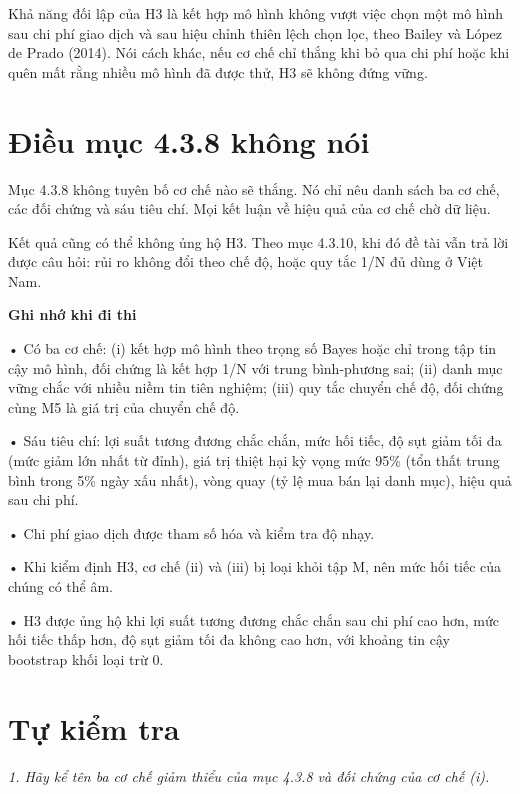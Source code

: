Khả năng đối lập của H3 là kết hợp mô hình không vượt việc chọn một mô hình sau chi phí giao dịch và sau hiệu chỉnh thiên lệch chọn lọc, theo Bailey và López de Prado (2014). Nói cách khác, nếu cơ chế chỉ thắng khi bỏ qua chi phí hoặc khi quên mất rằng nhiều mô hình đã được thử, H3 sẽ không đứng vững.

\section{Điều mục 4.3.8 không nói}

Mục 4.3.8 không tuyên bố cơ chế nào sẽ thắng. Nó chỉ nêu danh sách ba cơ chế, các đối chứng và sáu tiêu chí. Mọi kết luận về hiệu quả của cơ chế chờ dữ liệu.

Kết quả cũng có thể không ủng hộ H3. Theo mục 4.3.10, khi đó đề tài vẫn trả lời được câu hỏi: rủi ro không đổi theo chế độ, hoặc quy tắc 1/N đủ dùng ở Việt Nam.

\begin{tcolorbox}[breakable]
\textbf{Ghi nhớ khi đi thi}

• Có ba cơ chế: (i) kết hợp mô hình theo trọng số Bayes hoặc chỉ trong tập tin cậy mô hình, đối chứng là kết hợp 1/N với trung bình-phương sai; (ii) danh mục vững chắc với nhiều niềm tin tiên nghiệm; (iii) quy tắc chuyển chế độ, đối chứng cùng M5 là giá trị của chuyển chế độ.

• Sáu tiêu chí: lợi suất tương đương chắc chắn, mức hối tiếc, độ sụt giảm tối đa (mức giảm lớn nhất từ đỉnh), giá trị thiệt hại kỳ vọng mức 95\% (tổn thất trung bình trong 5\% ngày xấu nhất), vòng quay (tỷ lệ mua bán lại danh mục), hiệu quả sau chi phí.

• Chi phí giao dịch được tham số hóa và kiểm tra độ nhạy.

• Khi kiểm định H3, cơ chế (ii) và (iii) bị loại khỏi tập M, nên mức hối tiếc của chúng có thể âm.

• H3 được ủng hộ khi lợi suất tương đương chắc chắn sau chi phí cao hơn, mức hối tiếc thấp hơn, độ sụt giảm tối đa không cao hơn, với khoảng tin cậy bootstrap khối loại trừ 0.
\end{tcolorbox}

\section{Tự kiểm tra}

{\itshape 1. Hãy kể tên ba cơ chế giảm thiểu của mục 4.3.8 và đối chứng của cơ chế (i).\par}

